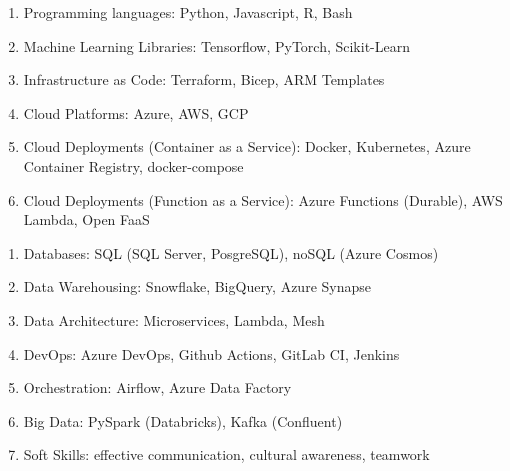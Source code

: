\documentclass[a4paper, 12]{scrartcl}
\newcommand{\preSectionSpace}{\vspace{3.5pt}}
\newcommand{\composedCvSection}[1]{\preSectionSpace{\large\textcolor{black}{#1}}}
\begin{document}
            \parbox{1.0\linewidth}{
                \composedCvSection{Skills}
                
                \parbox{0.49\linewidth}{
		          \begin{flushleft}
                        \begin{enumerate}
                            \item Programming languages: Python, Javascript, R, Bash
                            \item Machine Learning Libraries: Tensorflow, PyTorch, Scikit-Learn
                            \item Infrastructure as Code: Terraform, Bicep, ARM Templates
                            \item Cloud Platforms: Azure, AWS, GCP
                            \item Cloud Deployments (Container as a Service): Docker, Kubernetes, Azure Container Registry, docker-compose
                            \item Cloud Deployments (Function as a Service): Azure Functions (Durable), AWS Lambda, Open FaaS
                        \end{enumerate}
	       	   \end{flushleft}
                }
                \parbox{0.49\linewidth}{
                     \begin{flushleft}
                        \begin{enumerate}
                            \item Databases: SQL (SQL Server, PosgreSQL), noSQL (Azure Cosmos)
        				\item Data Warehousing: Snowflake, BigQuery, Azure Synapse
        				\item Data Architecture: Microservices, Lambda, Mesh
                            \item DevOps: Azure DevOps, Github Actions, GitLab CI, Jenkins
                            \item Orchestration: Airflow, Azure Data Factory
                            \item Big Data: PySpark (Databricks), Kafka (Confluent)
                            \item Soft Skills: effective communication, cultural awareness, teamwork
                        \end{enumerate}
	       	   \end{flushleft}
                }}
            
\end{document}
